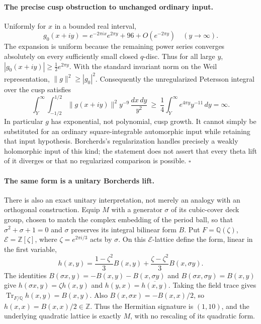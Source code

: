 \documentclass[11pt,a4paper]{article}
\begin{document}
\paragraph{The precise cusp obstruction to unchanged ordinary input.}
Uniformly for $x$ in a bounded real interval,
\[
                g_0(x+iy)=e^{-2\pi i x}e^{2\pi y}
                                      +96+O(e^{-2\pi y})
                         \quad(y\longrightarrow\infty).
\]
The expansion is uniform because the remaining power
series converges absolutely on every sufficiently
small closed $q$-disc. Thus for all large $y$,
$|g_0(x+iy)|\ge\tfrac12e^{2\pi y}$.
With the standard invariant norm on the Weil
representation, $\|g\|^2\ge|g_0|^2$.
Consequently the unregularized Petersson integral
over the cusp satisfies
\[
 \int_Y^\infty\int_{-1/2}^{1/2}
            \|g(x+iy)\|^2 y^{-9}\,\frac{dx\,dy}{y^2}
       \ \ge\ \frac14\int_Y^\infty e^{4\pi y}y^{-11}\,dy
       =\infty.
 \tag{P-F46h}
\]
In particular $g$ has exponential, not polynomial,
cusp growth. It cannot simply be substituted for an
ordinary square-integrable automorphic input while
retaining that input hypothesis. Borcherds's
regularization handles precisely a weakly holomorphic
input of this kind; the statement does not assert
that every theta lift of it diverges or that no
regularized comparison is possible.
\hfill$\square$

\paragraph{The same form is a unitary Borcherds lift.}
There is also an exact unitary interpretation, not merely
an analogy with an orthogonal construction. Equip $M$ with
a generator $\sigma$ of its cubic-cover deck group,
chosen to match the complex embedding of the period ball,
so that
$\sigma^2+\sigma+1=0$ and $\sigma$ preserves its integral
bilinear form $B$. Put $F=\mathbb Q(\zeta)$,
$\mathcal E=\mathbb Z[\zeta]$, where
$\zeta=e^{2\pi i/3}$ acts by $\sigma$. On this
$\mathcal E$-lattice define the form, linear in the first
variable,
\[
 h(x,y)=\frac{1-\zeta^2}{3}B(x,y)
           +\frac{\zeta-\zeta^2}{3}B(x,\sigma y).
 \tag{P-F46l}
\]
The identities $B(\sigma x,y)=-B(x,y)-B(x,\sigma y)$
and $B(\sigma x,\sigma y)=B(x,y)$ give
$h(\sigma x,y)=\zeta h(x,y)$ and
$h(y,x)=\overline{h(x,y)}$. Taking the field trace gives
$\operatorname{Tr}_{F/\mathbb Q}h(x,y)=B(x,y)$.
Also $B(x,\sigma x)=-B(x,x)/2$, so
$h(x,x)=B(x,x)/2\in\mathbb Z$.
Thus the Hermitian signature is $(1,10)$, and the
underlying quadratic lattice is exactly $M$, with no
rescaling of its quadratic form.
\end{document}
